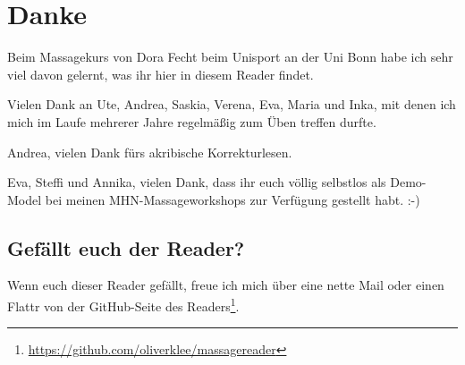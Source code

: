 \section*{Danke}

Beim Massagekurs von Dora Fecht beim Unisport an der Uni Bonn habe ich sehr viel davon gelernt, was ihr hier in diesem Reader findet.

Vielen Dank an Ute, Andrea, Saskia, Verena, Eva, Maria und Inka, mit denen ich mich im Laufe mehrerer Jahre regelmäßig zum Üben treffen durfte.

Andrea, vielen Dank fürs akribische Korrekturlesen.

Eva, Steffi und Annika, vielen Dank, dass ihr euch völlig selbstlos als Demo-Model bei meinen MHN-Massageworkshops zur Verfügung gestellt habt. :-)

\subsection*{Gefällt euch der Reader?}

Wenn euch dieser Reader gefällt, freue ich mich über eine nette Mail oder einen Flattr von der GitHub-Seite des Readers\footnote{\url{https://github.com/oliverklee/massagereader}}.
